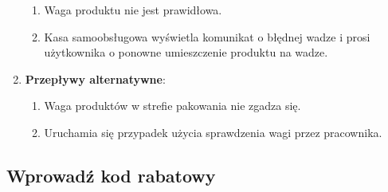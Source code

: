 \documentclass{article}
\begin{document}
\begin{enumerate}
\begin{enumerate}
\item Waga produktu nie jest prawidłowa.
\item Kasa samoobsługowa wyświetla komunikat o błędnej wadze i prosi użytkownika o ponowne umieszczenie produktu na wadze.
\end{enumerate}
\item \textbf{Przepływy alternatywne}:
\begin{enumerate}
\item Waga produktów w strefie pakowania nie zgadza się.
\item Uruchamia się przypadek użycia sprawdzenia wagi przez pracownika.
\end{enumerate}
\end{enumerate}
\subsection{Wprowadź kod rabatowy}
\end{document}
